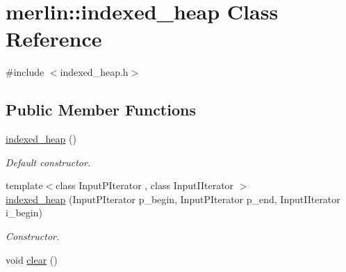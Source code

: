 \hypertarget{classmerlin_1_1indexed__heap}{}\section{merlin\+:\+:indexed\+\_\+heap Class Reference}
\label{classmerlin_1_1indexed__heap}


{\ttfamily \#include $<$indexed\+\_\+heap.\+h$>$}

\subsection*{Public Member Functions}
\begin{DoxyCompactItemize}
\item 
\hyperlink{classmerlin_1_1indexed__heap_a40ea288cdd3efb144b3fd1932720faec}{indexed\+\_\+heap} ()\hypertarget{classmerlin_1_1indexed__heap_a40ea288cdd3efb144b3fd1932720faec}{}\label{classmerlin_1_1indexed__heap_a40ea288cdd3efb144b3fd1932720faec}

\begin{DoxyCompactList}\small\item\em Default constructor. \end{DoxyCompactList}\item 
{\footnotesize template$<$class Input\+P\+Iterator , class Input\+I\+Iterator $>$ }\\\hyperlink{classmerlin_1_1indexed__heap_a19f224637f41b40dfb77dd5b1ecd4906}{indexed\+\_\+heap} (Input\+P\+Iterator p\+\_\+begin, Input\+P\+Iterator p\+\_\+end, Input\+I\+Iterator i\+\_\+begin)\hypertarget{classmerlin_1_1indexed__heap_a19f224637f41b40dfb77dd5b1ecd4906}{}\label{classmerlin_1_1indexed__heap_a19f224637f41b40dfb77dd5b1ecd4906}

\begin{DoxyCompactList}\small\item\em Constructor. \end{DoxyCompactList}\item 
void \hyperlink{classmerlin_1_1indexed__heap_ae77fc9d651b4b1887a0cdf2be337c3d8}{clear} ()\hypertarget{classmerlin_1_1indexed__heap_ae77fc9d651b4b1887a0cdf2be337c3d8}{}\label{classmerlin_1_1indexed__heap_ae77fc9d651b4b1887a0cdf2be337c3d8}


\end{DoxyCompactItemize}
